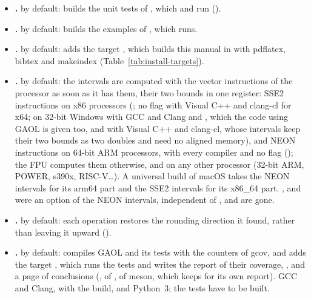 \begin{itemize}
  meson are checked by the continuous integration alone. The generator of
  Xcode, which builds arm64 and x86\_64 by itself when no list is given, is
  given the architecture of the machine, as the other generators build for
  it; the list  asks for the universal build.\newinvfive
\item[$\bullet$] \textbf{.}  by default: builds
  the unit tests of , which  and 
  run ().
\item[$\bullet$] \textbf{.}  by default:
  builds the examples of , which  runs.
\item[$\bullet$] \textbf{.}  by default: adds the
  target , which builds this manual in
   with pdflatex, bibtex and makeindex
  (Table~\ref{tab:install-targets}).\newinvfive
\item[$\bullet$] \textbf{.}  by default: the
  intervals are computed with the vector instructions of the processor as
  soon as it has them, their two bounds in one register: SSE2 instructions on
  x86 processors (; no flag with Visual C++ and
  clang-cl for x64; on 32-bit Windows with GCC and Clang and
  , which the code using GAOL is given too, and with
  Visual C++ and clang-cl, whose intervals keep their two bounds as two
  doubles and need no aligned memory), and NEON instructions on 64-bit ARM
  processors, with every compiler and no flag (); the FPU
  computes them otherwise, and on any other processor (32-bit ARM, POWER,
  s390x, RISC-V\ldots). A universal build of macOS takes the NEON intervals
  for its arm64 part and the SSE2 intervals for its x86\_64 part.
  ,  and  were
  an option of the NEON intervals, independent of , and
  are gone.\newinvfive
{}%
%
\item[$\bullet$] \textbf{.}  by
  default: each operation restores the rounding direction it found, rather
  than leaving it upward ().%
%
\item[$\bullet$] \textbf{.}  by default:
  compiles GAOL and its tests with the counters of gcov, and adds the target
  , which runs the tests and writes the report of their
  coverage, , and a page of conclusions
  (,  of
  ,  of meson, which keeps
   for its own report). GCC and Clang, with the 
  build,  and Python~3; the tests have to be built.
%
\end{itemize}

